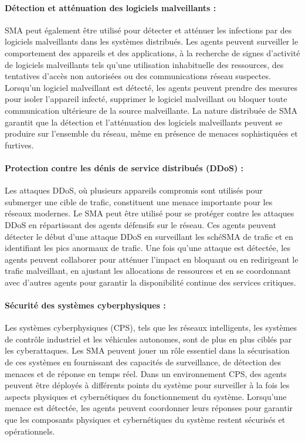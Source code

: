 \paragraph{Détection et atténuation des logiciels malveillants :}
SMA peut également être utilisé pour détecter et atténuer les infections par des logiciels malveillants dans les systèmes distribués. Les agents peuvent surveiller le comportement des appareils et des applications, à la recherche de signes d'activité de logiciels malveillants tels qu'une utilisation inhabituelle des ressources, des tentatives d'accès non autorisées ou des communications réseau suspectes. Lorsqu'un logiciel malveillant est détecté, les agents peuvent prendre des mesures pour isoler l'appareil infecté, supprimer le logiciel malveillant ou bloquer toute communication ultérieure de la source malveillante. La nature distribuée de SMA garantit que la détection et l'atténuation des logiciels malveillants peuvent se produire sur l'ensemble du réseau, même en présence de menaces sophistiquées et furtives.

\paragraph{Protection contre les dénis de service distribués (DDoS) :}
Les attaques DDoS, où plusieurs appareils compromis sont utilisés pour submerger une cible de trafic, constituent une menace importante pour les réseaux modernes. Le SMA peut être utilisé pour se protéger contre les attaques DDoS en répartissant des agents défensifs sur le réseau. Ces agents peuvent détecter le début d'une attaque DDoS en surveillant les schéSMA de trafic et en identifiant les pics anormaux de trafic. Une fois qu'une attaque est détectée, les agents peuvent collaborer pour atténuer l'impact en bloquant ou en redirigeant le trafic malveillant, en ajustant les allocations de ressources et en se coordonnant avec d'autres agents pour garantir la disponibilité continue des services critiques.

\paragraph{Sécurité des systèmes cyberphysiques :}
Les systèmes cyberphysiques (CPS), tels que les réseaux intelligents, les systèmes de contrôle industriel et les véhicules autonomes, sont de plus en plus ciblés par les cyberattaques. Les SMA peuvent jouer un rôle essentiel dans la sécurisation de ces systèmes en fournissant des capacités de surveillance, de détection des menaces et de réponse en temps réel. Dans un environnement CPS, des agents peuvent être déployés à différents points du système pour surveiller à la fois les aspects physiques et cybernétiques du fonctionnement du système. Lorsqu'une menace est détectée, les agents peuvent coordonner leurs réponses pour garantir que les composants physiques et cybernétiques du système restent sécurisés et opérationnels.


